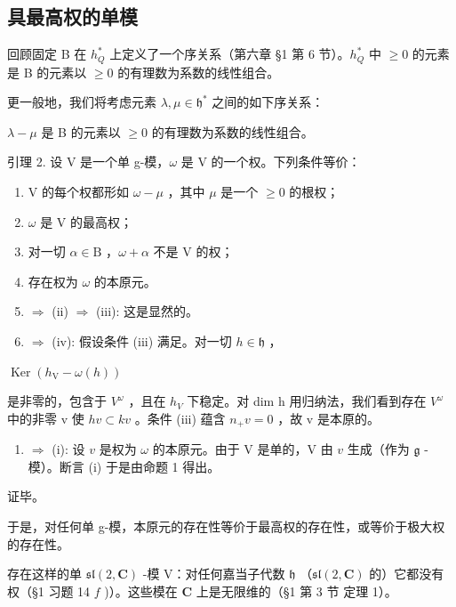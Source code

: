 \subsection{具最高权的单模}

回顾固定 B 在 \(h_{Q}^{*}\) 上定义了一个序关系（第六章 §1 第 6 节）。\(h_{Q}^{*}\) 中 \(\geq 0\) 的元素是 B 的元素以 \(\geq 0\) 的有理数为系数的线性组合。

更一般地，我们将考虑元素 \(\lambda, \mu \in \mathfrak{h}^*\) 之间的如下序关系：

\(\lambda - \mu\) 是 B 的元素以 \(\geq 0\) 的有理数为系数的线性组合。

引理 2. 设 V 是一个单 g-模，\(\omega\) 是 V 的一个权。下列条件等价：

\begin{enumerate}
\def\labelenumi{(\roman{enumi})}
\item
  V 的每个权都形如 \(\omega -\mu\) ，其中 \(\mu\) 是一个 \(\geq 0\) 的根权；
\item
  \(\omega\) 是 V 的最高权；
\item
  对一切 \(\alpha \in \mathrm{B}\) ，\(\omega + \alpha\) 不是 V 的权；
\item
  存在权为 \(\omega\) 的本原元。
\item
  \(\Longrightarrow\) (ii) \(\Longrightarrow\) (iii): 这是显然的。
\item
  \(\Longrightarrow\) (iv): 假设条件 (iii) 满足。对一切 \(h\in \mathfrak{h}\) ，
\end{enumerate}

\(\operatorname {Ker}(h_{\mathrm{V}} - \omega (h))\)

是非零的，包含于 \(V^{\omega}\) ，且在 \(h_{V}\) 下稳定。对 dim h 用归纳法，我们看到存在 \(V^{\omega}\) 中的非零 v 使 \(h v \subset kv\) 。条件 (iii) 蕴含 \(n_{+}v = 0\) ，故 v 是本原的。

\begin{enumerate}
\def\labelenumi{(\roman{enumi})}
\setcounter{enumi}{3}
\tightlist
\item
  \(\Longrightarrow\) (i): 设 \(v\) 是权为 \(\omega\) 的本原元。由于 V 是单的，V 由 \(v\) 生成（作为 \(\mathfrak{g}\) -模）。断言 (i) 于是由命题 1 得出。
\end{enumerate}

证毕。

于是，对任何单 g-模，本原元的存在性等价于最高权的存在性，或等价于极大权的存在性。

存在这样的单 \(\mathfrak{sl}(2,\mathbf{C})\) -模 V：对任何嘉当子代数 \(\mathfrak{h}\) （\(\mathfrak{sl}(2,\mathbf{C})\) 的）它都没有权（§1 习题 14 \(f\) )）。这些模在 \(\mathbf{C}\) 上是无限维的（§1 第 3 节 定理 1）。

